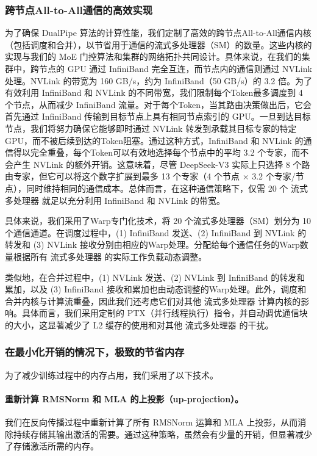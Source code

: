 \documentclass[lang=cn,a4paper,newtx]{elegantpaper}
\newcommand{\dsviii}{DeepSeek-V3}
\begin{document}
\subsubsection{跨节点All-to-All通信的高效实现}

为了确保 DualPipe 算法的计算性能，我们定制了高效的跨节点All-to-All通信内核（包括调度和合并），以节省用于通信的流式多处理器（SM）的数量。这些内核的实现与我们的 MoE 门控算法和集群的网络拓扑共同设计。具体来说，在我们的集群中，跨节点的 GPU 通过 InfiniBand 完全互连，而节点内的通信则通过 NVLink 处理。NVLink 的带宽为 160 GB/s，约为 InfiniBand（50 GB/s）的 3.2 倍。为了有效利用 InfiniBand 和 NVLink 的不同带宽，我们限制每个Token最多调度到 4 个节点，从而减少 InfiniBand 流量。对于每个Token，当其路由决策做出后，它会首先通过 InfiniBand 传输到目标节点上具有相同节点索引的 GPU。一旦到达目标节点，我们将努力确保它能够即时通过 NVLink 转发到承载其目标专家的特定 GPU，而不被后续到达的Token阻塞。通过这种方式，InfiniBand 和 NVLink 的通信得以完全重叠，每个Token可以有效地选择每个节点中的平均 3.2 个专家，而不会产生 NVLink 的额外开销。这意味着，尽管 \dsviii{} 实际上只选择 8 个路由专家，但它可以将这个数字扩展到最多 13 个专家（4 个节点 × 3.2 个专家/节点），同时维持相同的通信成本。总体而言，在这种通信策略下，仅需 20 个 流式多处理器 就足以充分利用 InfiniBand 和 NVLink 的带宽。

具体来说，我们采用了Warp专门化技术，将 20 个流式多处理器（SM）划分为 10 个通信通道。在调度过程中，(1) InfiniBand 发送、(2) InfiniBand 到 NVLink 的转发和 (3) NVLink 接收分别由相应的Warp处理。分配给每个通信任务的Warp数量根据所有 流式多处理器 的实际工作负载动态调整。

类似地，在合并过程中，(1) NVLink 发送、(2) NVLink 到 InfiniBand 的转发和累加，以及 (3) InfiniBand 接收和累加也由动态调整的Warp处理。此外，调度和合并内核与计算流重叠，因此我们还考虑它们对其他 流式多处理器 计算内核的影响。具体而言，我们采用定制的 PTX（并行线程执行）指令，并自动调优通信块的大小，这显著减少了 L2 缓存的使用和对其他 流式多处理器 的干扰。

\subsubsection{在最小化开销的情况下，极致的节省内存}

为了减少训练过程中的内存占用，我们采用了以下技术。

\paragraph{重新计算 RMSNorm 和 MLA 的上投影（up-projection）。}
我们在反向传播过程中重新计算了所有 RMSNorm 运算和 MLA 上投影，从而消除持续存储其输出激活的需要。通过这种策略，虽然会有少量的开销，但显著减少了存储激活所需的内存。
\end{document}
